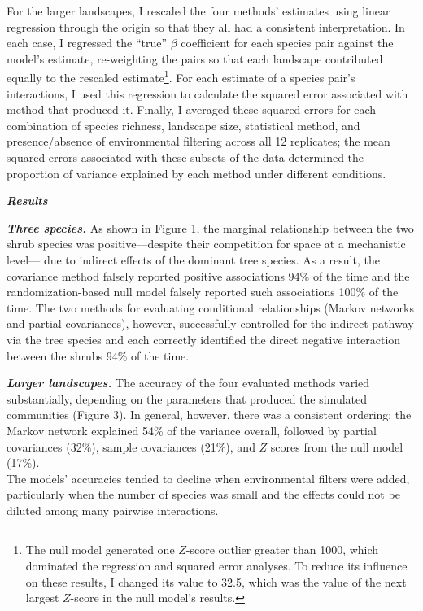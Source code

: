 \documentclass[12pt,]{article}
\begin{document}
\begin{spacing}{1.9}
\begin{flushleft}
For the larger landscapes, I rescaled the four methods' estimates using
linear regression through the origin so that they all had a consistent
interpretation. In each case, I regressed the ``true'' \(\beta\)
coefficient for each species pair against the model's estimate,
re-weighting the pairs so that each landscape contributed equally to the
rescaled estimate\footnote{The null model generated one \(Z\)-score
  outlier greater than 1000, which dominated the regression and squared
  error analyses. To reduce its influence on these results, I changed
  its value to 32.5, which was the value of the next largest \(Z\)-score
  in the null model's results.}. For each estimate of a species pair's
interactions, I used this regression to calculate the squared error
associated with method that produced it. Finally, I averaged these
squared errors for each combination of species richness, landscape size,
statistical method, and presence/absence of environmental filtering
across all 12 replicates; the mean squared errors associated with these
subsets of the data determined the proportion of variance explained by
each method under different conditions.

\textbf{\emph{Results}}

\textbf{\emph{Three species.}} As shown in Figure 1, the marginal
relationship between the two shrub species was positive---despite their
competition for space at a mechanistic level--- due to indirect effects
of the dominant tree species. As a result, the covariance method falsely
reported positive associations 94\% of the time and the
randomization-based null model falsely reported such associations 100\%
of the time. The two methods for evaluating conditional relationships
(Markov networks and partial covariances), however, successfully
controlled for the indirect pathway via the tree species and each
correctly identified the direct negative interaction between the shrubs
94\% of the time.

\textbf{\emph{Larger landscapes.}} The accuracy of the four evaluated
methods varied substantially, depending on the parameters that produced
the simulated communities (Figure 3). In general, however, there was a
consistent ordering: the Markov network explained 54\% of the variance
overall, followed by partial covariances (32\%), sample covariances
(21\%), and \(Z\) scores from the null model (17\%).\\The models'
accuracies tended to decline when environmental filters were added,
particularly when the number of species was small and the effects could
not be diluted among many pairwise interactions.


\end{flushleft}
\end{spacing}
\end{document}
